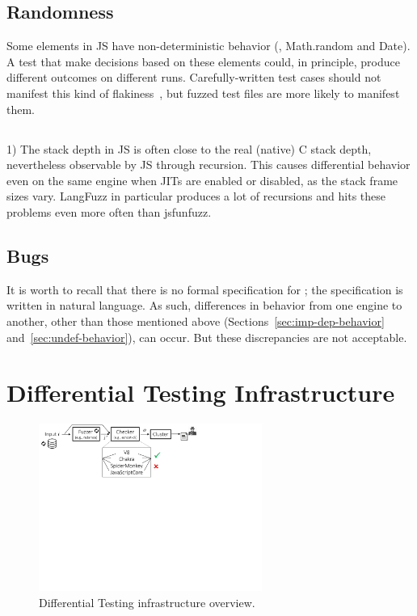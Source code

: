 \documentclass[10pt,conference,anonymous]{IEEEtran}
\begin{document}
\subsection{Randomness}

\sloppy Some elements in JS have non-deterministic behavior (\eg{},
Math.random and Date). A test that make decisions based on these
elements could, in principle, produce different outcomes on different
runs. Carefully-written test cases should not manifest this kind of
flakiness~\cite{luo-etal-fse2014,palomba-zaidman-icsme2017}, but
fuzzed test files are more likely to manifest them.

\subsection{}

1) The stack depth in JS is often close to the real (native) C stack
depth, nevertheless observable by JS through recursion. This causes
differential behavior even on the same engine when JITs are enabled or
disabled, as the stack frame sizes vary. LangFuzz in particular
produces a lot of recursions and hits these problems even more often
than jsfunfuzz.

\subsection{Bugs}

It is worth to recall that there is no formal specification for \es{};
the specification is written in natural language. As such, differences
in behavior from one engine to another, other than those mentioned
above (Sections~\ref{sec:imp-dep-behavior}
and~\ref{sec:undef-behavior}), can occur. But these discrepancies are
not acceptable.


\section{Differential Testing Infrastructure}
\label{sec:design}


\begin{figure}[t]
  \centering
  \includegraphics[trim=0 350 0 0,clip,width=0.65\textwidth]{diff-testing-runtimes}
  \caption{\label{fig:workflow}Differential Testing infrastructure overview.}
\end{figure}
\end{document}
